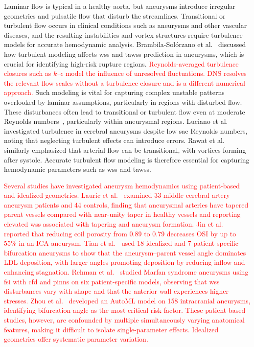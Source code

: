 \documentclass[12pt,a4paper]{article}
\newcommand{\cfdrevision}[1]{\textcolor{red}{#1}}
\newcommand{\CFD}{\ac{cfd}\xspace}
\newcommand{\FSI}{\ac{fsi}\xspace}
\newcommand{\PINNs}{\acp{pinn}\xspace}
\newcommand{\WSS}{\ac{wss}\xspace}
\newcommand{\TAWSS}{\ac{tawss}\xspace}
\newcommand{\OSI}{\ac{OSI}\xspace}
\newcommand{\ICA}{\ac{ICA}\xspace}
\newcommand{\DNS}{\ac{DNS}\xspace}
\newcommand{\LDL}{\ac{LDL}\xspace}
\theoremstyle{definition}
\numberwithin{equation}{section}
\newcommand{\revision}[1]{\textcolor{red}{#1}}
\begin{document}
Laminar flow is typical in a healthy aorta, but aneurysms introduce irregular geometries and pulsatile flow that disturb the streamlines. Transitional or turbulent flow occurs in clinical conditions such as aneurysms and other vascular diseases, and the resulting instabilities and vortex structures require turbulence models for accurate hemodynamic analysis. Brambila-Solórzano et al.~\cite{brambila2023influence} discussed how turbulent modeling affects \WSS and \TAWSS prediction in aneurysms, which is crucial for identifying high-risk rupture regions.   \revision{\cfdrevision{Reynolds-averaged turbulence closures such as $k$--$\epsilon$ model the influence of unresolved fluctuations. \DNS resolves the relevant flow scales without a turbulence closure and is a different numerical approach.} } Such modeling is vital for capturing complex unstable patterns overlooked by laminar assumptions, particularly in regions with disturbed flow. These disturbances often lead to transitional or turbulent flow even at moderate Reynolds numbers~\cite{evju2015assumption}, particularly within aneurysmal regions. Luciano et al.~\cite{luciano2024turbulent} investigated turbulence in cerebral aneurysms despite low sac Reynolds numbers, noting that neglecting turbulent effects can introduce errors. Rawat et al.~\cite{rawat2019numerical} similarly emphasized that arterial flow can be transitional, with vortices forming after systole. Accurate turbulent flow modeling is therefore essential for capturing hemodynamic parameters such as \WSS and \TAWSS.

\revision{Several studies have investigated aneurysm hemodynamics using patient-based and idealized geometries. Lauric et al.~\cite{lauric2019proximal} examined 33 middle cerebral artery aneurysm patients and 44 controls, finding that aneurysmal arteries have tapered parent vessels compared with near-unity taper in healthy vessels and reporting elevated \WSS associated with tapering and aneurysm formation. Jin et al.~\cite{jin2023cfd} reported that reducing coil porosity from 0.89 to 0.79 decreases \OSI by up to 55\% in an \ICA aneurysm. Tian et al.~\cite{tian2023influence} used 18 idealized and 7 patient-specific bifurcation aneurysms to show that the aneurysm--parent vessel angle dominates \LDL deposition, with larger angles promoting deposition by reducing inflow and enhancing stagnation. Rehman et al.~\cite{ur2025fluid} studied Marfan syndrome aneurysms using \FSI with \CFD and \PINNs on six patient-specific models, observing that \WSS disturbances vary with shape and that the anterior wall experiences higher stresses. Zhou et al.~\cite{zhou2026morphological} developed an AutoML model on 158 intracranial aneurysms, identifying bifurcation angle as the most critical risk factor. These patient-based studies, however, are confounded by multiple simultaneously varying anatomical features, making it difficult to isolate single-parameter effects. Idealized geometries offer systematic parameter variation.}
\end{document}
